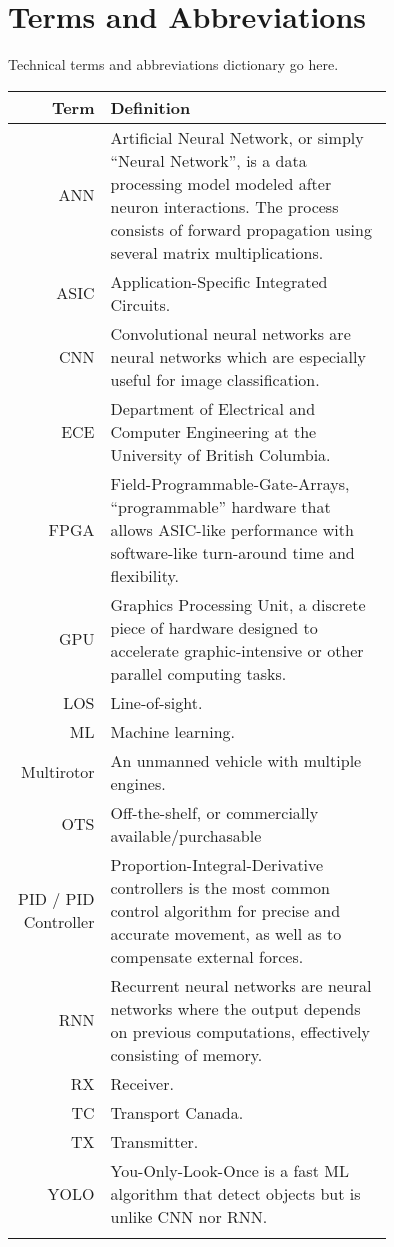 \thispagestyle{empty}

\section*{Terms and Abbreviations}

Technical terms and abbreviations dictionary go here.

\begin{tabular}[h]{rp{0.75\linewidth}}
    \hline
    \textbf{Term} & \textbf{Definition}\\
    \hline

    ANN & Artificial Neural Network, or simply ``Neural Network'', is a data processing model modeled after neuron interactions. The process consists of forward propagation using several matrix multiplications.\cite{ann}\\
    ASIC & Application-Specific Integrated Circuits.\\
    CNN & Convolutional neural networks are neural networks which are especially useful for image classification.\cite{cnn} \\
    ECE & Department of Electrical and Computer Engineering at the University of British Columbia.\\
    FPGA & Field-Programmable-Gate-Arrays, ``programmable'' hardware that allows ASIC-like performance with software-like turn-around time and flexibility.\\
    GPU & Graphics Processing Unit, a discrete piece of hardware designed to accelerate graphic-intensive or other parallel computing tasks.\\
    LOS & Line-of-sight.\\
    ML & Machine learning.\\
    Multirotor & An unmanned vehicle with multiple engines. \\
    OTS & Off-the-shelf, or commercially available/purchasable \\
    PID / PID Controller & Proportion-Integral-Derivative controllers is the most common control algorithm for precise and accurate movement, as well as to compensate external forces.\cite{pid}\\
    RNN & Recurrent neural networks are neural networks where the output depends on previous computations, effectively consisting of memory.\cite{rnn}\\
    RX & Receiver.\\
    TC & Transport Canada.\\
    TX & Transmitter.\\
    YOLO & You-Only-Look-Once is a fast ML algorithm that detect objects but is unlike CNN nor RNN.\cite{yolo}\cite{yolo-2}\\
     & \\

    \hline

\end{tabular}
